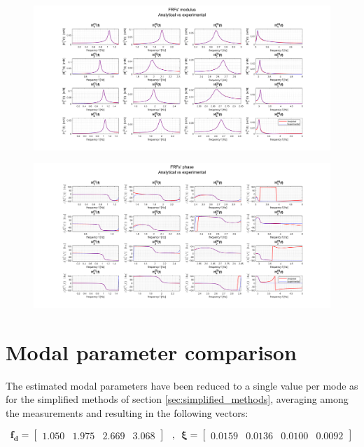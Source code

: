 \documentclass[a4paper,12pt,oneside]{article}
\begin{document}
\begin{figure}[h]
	\hspace{-70pt}
	\includegraphics[scale=0.4]{frfs_anal_vs_exp_modulus}
\end{figure}

\begin{figure}[H]
	\hspace{-70pt}
	\includegraphics[scale=0.4]{frfs_anal_vs_exp_phase}
\end{figure}


\section{Modal parameter comparison}

The estimated modal parameters have been reduced to a single value per mode as for the simplified methods of section \ref{sec:simplified_methods}, averaging among the measurements and resulting in the following vectors:

\[
	\mathbf{f_d} =	\begin{bmatrix}
										1.050 & 1.975 & 2.669 & 3.068
									\end{bmatrix} \text{~ , ~}
		\bm{\xi} =	\begin{bmatrix}
									0.0159 & 0.0136 & 0.0100 & 0.0092
								\end{bmatrix}
\]
\end{document}
